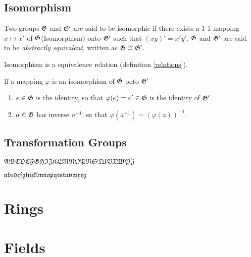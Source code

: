 	\subsection{Isomorphism}
		\begin{definition}
		Two groups $\mathfrak{G}$ and $\mathfrak{G}'$ are said to be isomorphic if there exists a 1-1 mapping $x\mapsto x'$ of $\mathfrak{G}$(Isomorphism) onto $\mathfrak{G}'$ such that $(xy)'=x'y'$. $\mathfrak{G}$ and $\mathfrak{G}'$ are said to be \textit{abstractly equivalent}, written as $\mathfrak{G}\cong\mathfrak{G}'$.
		\end{definition}
		\begin{theorem}
		Isomorphism is a equivalence relation (definition \ref{relations}). 
		\end{theorem}
		\begin{theorem}
		If a mapping $\varphi$ is an isomorphism of $\mathfrak{G}$ onto $\mathfrak{G}'$
 		\begin{enumerate}
		\item $e\in\mathfrak{G}$ is the identity, so that $\varphi(e)=e'\in\mathfrak{G}$ is the identity of $\mathfrak{G}'$.
		\item $a\in\mathfrak{G}$ has inverse $a^{-1}$, so that $\varphi(a^{-1})=(\varphi(a))^{-1}$.
		\end{enumerate}
		\end{theorem}
	\subsection{Transformation Groups}
	$\mathfrak{ABCDEFGHIJKLMNOPRSTUVXWYZ}$
	
	$\mathfrak{abcdefghijklmnopqrstuvwxyz}$
	\section{Rings}
	\section{Fields}
	
